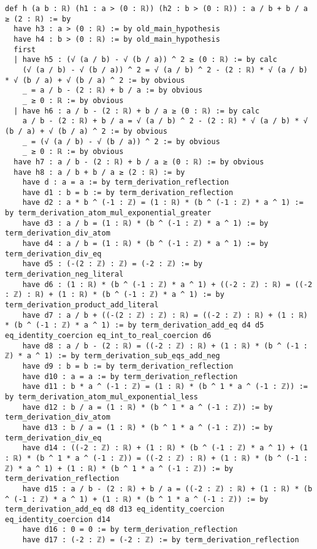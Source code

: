 \documentclass{article}
\begin{document}
\begin{tcolorbox}[colback=white!10, width=\linewidth]
\begin{lstlisting}[language=Lean4]
def h (a b : ℝ) (h1 : a > (0 : ℝ)) (h2 : b > (0 : ℝ)) : a / b + b / a ≥ (2 : ℝ) := by
  have h3 : a > (0 : ℝ) := by old_main_hypothesis
  have h4 : b > (0 : ℝ) := by old_main_hypothesis
  first
  | have h5 : (√ (a / b) - √ (b / a)) ^ 2 ≥ (0 : ℝ) := by calc
    (√ (a / b) - √ (b / a)) ^ 2 = √ (a / b) ^ 2 - (2 : ℝ) * √ (a / b) * √ (b / a) + √ (b / a) ^ 2 := by obvious
    _ = a / b - (2 : ℝ) + b / a := by obvious
    _ ≥ 0 : ℝ := by obvious
  | have h6 : a / b - (2 : ℝ) + b / a ≥ (0 : ℝ) := by calc
    a / b - (2 : ℝ) + b / a = √ (a / b) ^ 2 - (2 : ℝ) * √ (a / b) * √ (b / a) + √ (b / a) ^ 2 := by obvious
    _ = (√ (a / b) - √ (b / a)) ^ 2 := by obvious
    _ ≥ 0 : ℝ := by obvious
  have h7 : a / b - (2 : ℝ) + b / a ≥ (0 : ℝ) := by obvious
  have h8 : a / b + b / a ≥ (2 : ℝ) := by
    have d : a = a := by term_derivation_reflection
    have d1 : b = b := by term_derivation_reflection
    have d2 : a * b ^ (-1 : ℤ) = (1 : ℝ) * (b ^ (-1 : ℤ) * a ^ 1) := by term_derivation_atom_mul_exponential_greater
    have d3 : a / b = (1 : ℝ) * (b ^ (-1 : ℤ) * a ^ 1) := by term_derivation_div_atom
    have d4 : a / b = (1 : ℝ) * (b ^ (-1 : ℤ) * a ^ 1) := by term_derivation_div_eq
    have d5 : (-(2 : ℤ) : ℤ) = (-2 : ℤ) := by term_derivation_neg_literal
    have d6 : (1 : ℝ) * (b ^ (-1 : ℤ) * a ^ 1) + ((-2 : ℤ) : ℝ) = ((-2 : ℤ) : ℝ) + (1 : ℝ) * (b ^ (-1 : ℤ) * a ^ 1) := by term_derivation_product_add_literal
    have d7 : a / b + ((-(2 : ℤ) : ℤ) : ℝ) = ((-2 : ℤ) : ℝ) + (1 : ℝ) * (b ^ (-1 : ℤ) * a ^ 1) := by term_derivation_add_eq d4 d5 eq_identity_coercion eq_int_to_real_coercion d6
    have d8 : a / b - (2 : ℝ) = ((-2 : ℤ) : ℝ) + (1 : ℝ) * (b ^ (-1 : ℤ) * a ^ 1) := by term_derivation_sub_eqs_add_neg
    have d9 : b = b := by term_derivation_reflection
    have d10 : a = a := by term_derivation_reflection
    have d11 : b * a ^ (-1 : ℤ) = (1 : ℝ) * (b ^ 1 * a ^ (-1 : ℤ)) := by term_derivation_atom_mul_exponential_less
    have d12 : b / a = (1 : ℝ) * (b ^ 1 * a ^ (-1 : ℤ)) := by term_derivation_div_atom
    have d13 : b / a = (1 : ℝ) * (b ^ 1 * a ^ (-1 : ℤ)) := by term_derivation_div_eq
    have d14 : ((-2 : ℤ) : ℝ) + (1 : ℝ) * (b ^ (-1 : ℤ) * a ^ 1) + (1 : ℝ) * (b ^ 1 * a ^ (-1 : ℤ)) = ((-2 : ℤ) : ℝ) + (1 : ℝ) * (b ^ (-1 : ℤ) * a ^ 1) + (1 : ℝ) * (b ^ 1 * a ^ (-1 : ℤ)) := by term_derivation_reflection
    have d15 : a / b - (2 : ℝ) + b / a = ((-2 : ℤ) : ℝ) + (1 : ℝ) * (b ^ (-1 : ℤ) * a ^ 1) + (1 : ℝ) * (b ^ 1 * a ^ (-1 : ℤ)) := by term_derivation_add_eq d8 d13 eq_identity_coercion eq_identity_coercion d14
    have d16 : 0 = 0 := by term_derivation_reflection
    have d17 : (-2 : ℤ) = (-2 : ℤ) := by term_derivation_reflection

\end{lstlisting}
\end{tcolorbox}
\end{document}
